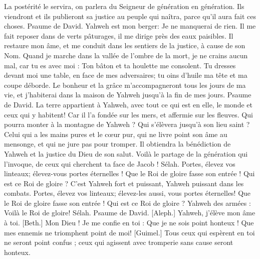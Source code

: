 \begin{multicols}{2}
La postérité le servira, on parlera du Seigneur de génération en génération.
Ils viendront et ils publieront sa justice au peuple qui naîtra, parce qu'il aura fait ces choses.
\VerseOne{}Psaume de David. Yahweh est mon berger: Je ne manquerai de rien.
Il me fait reposer dans de verts pâturages, il me dirige près des eaux paisibles.
Il restaure mon âme, et me conduit dans les sentiers de la justice, à cause de son Nom.
Quand je marche dans la vallée de l'ombre de la mort, je ne crains aucun mal, car tu es avec moi : Ton bâton et ta houlette me consolent.
Tu dresses devant moi une table, en face de mes adversaires; tu oins d'huile ma tête et ma coupe déborde.
Le bonheur et la grâce m'accompagneront tous les jours de ma vie, et j'habiterai dans la maison de Yahweh jusqu'à la fin de mes jours.
\VerseOne{}Psaume de David. La terre appartient à Yahweh, avec tout ce qui est en elle, le monde et ceux qui y habitent!
Car il l'a fondée sur les mers, et affermie sur les fleuves.
Qui pourra monter à la montagne de Yahweh ? Qui s'élèvera jusqu'à son lieu saint ?
Celui qui a les mains pures et le cœur pur, qui ne livre point son âme au mensonge, et qui ne jure pas pour tromper.
Il obtiendra la bénédiction de Yahweh et la justice du Dieu de son salut.
Voilà le partage de la génération qui l'invoque, de ceux qui cherchent ta face de Jacob ! Sélah.
Portes, élevez vos linteaux; élevez-vous portes éternelles ! Que le Roi de gloire fasse son entrée !
Qui est ce Roi de gloire ? C'est Yahweh fort et puissant, Yahweh puissant dans les combats.
Portes, élevez vos linteaux; élevez-les aussi, vous portes éternelles! Que le Roi de gloire fasse son entrée !
Qui est ce Roi de gloire ? Yahweh des armées : Voilà le Roi de gloire! Sélah.
\VerseOne{}Psaume de David. [Aleph.] Yahweh, j'élève mon âme à toi.
[Beth.] Mon Dieu ! Je me confie en toi : Que je ne sois point honteux ! Que mes ennemis ne triomphent point de moi!
[Guimel.] Tous ceux qui espèrent en toi ne seront point confus ; ceux qui agissent avec tromperie sans cause seront honteux.

\end{multicols}
